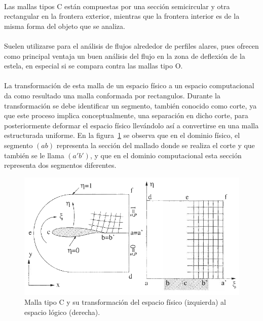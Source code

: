 \documentclass[letterpaper, openright, 12pt]{book}
\begin{document}
    \paragraph*{}
    Las mallas tipos C están compuestas por una sección semicircular y otra
    rectangular en la frontera exterior, mientras que la frontera interior
    es de la misma forma del objeto que se analiza.

    \paragraph*{}
    Suelen utilizarse para el análisis de flujos alrededor de perfiles
    alares, pues ofrecen como principal ventaja un buen análisis del flujo
    en la zona de deflexión de la estela, en especial si se compara contra
    las mallas tipo O.\cite{best-practices-grid-generation}

    \paragraph{}
    La transformación de esta malla de un espacio físico a un espacio
    computacional da como resultado una malla conformada por rectangulos.
    Durante la transformación se debe identificar un segmento, también
    conocido como corte, ya que este proceso implica conceptualmente, una
    separación en dicho corte, para posteriormente deformar el espacio
    físico llevándolo así a convertirse en una malla estructurada uniforme.
    En la figura~\ref{fig:malla-c} se observa que en el dominio físico, el
    segmento $(ab)$ representa la sección del mallado donde se realiza el
    corte y que también se le llama $(a'b')$, y que en el dominio
    computacional esta sección representa dos segmentos diferentes.
    \begin{figure}[htbp!]
        \centering
        \includegraphics[keepaspectratio, width=155mm]{./img/malla-c}
        \captionsetup{justification=centering, margin=2cm}
        \caption[Malla tipo C]{Malla tipo C y su transformación del espacio
            físico (izquierda) al espacio lógico (derecha).~\cite{blazek}}
        \label{fig:malla-c}
    \end{figure}
\end{document}
